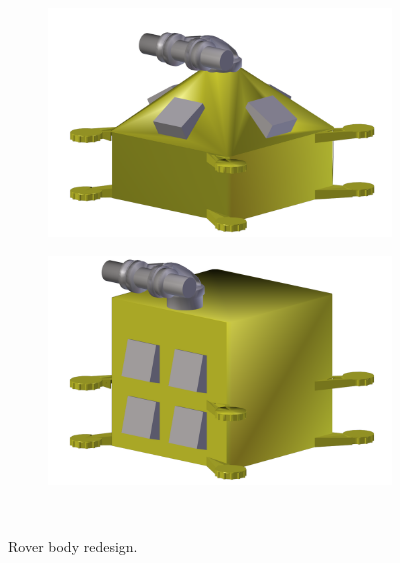 \begin{figure}[h]
\captionsetup[subfigure]{justification=centering}
\vspace{-2ex}
	\centering
    \setlength{\subfigureWidth}{0.50\textwidth}
    \setlength{\graphicsHeight}{50mm}
    \hypersetup{hidelinks=true}%
    \begin{subfigure}[t]{\subfigureWidth}
        \centering
        \includegraphics[height=\graphicsHeight]{sections/power-system-design/solar-array/images/body-before.png}
		\label{fig:sub:rover-body-redesign-before}
    \end{subfigure}\hfill
    \begin{subfigure}[t]{\subfigureWidth}
        \centering
        \includegraphics[height=\graphicsHeight]{sections/power-system-design/solar-array/images/body-after.png}
		\label{fig:sub:rover-body-redesign-after}
	\end{subfigure}\\[0.8ex]
    \caption[Rover body redesign]
            {Rover body redesign.}
    \label{fig:rover-body-redesign}
\vspace{-2ex}
\end{figure}

